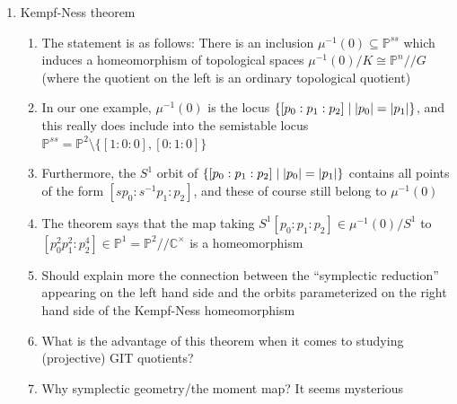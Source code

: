 \documentclass[11pt,leqno]{article}
\theoremstyle{plain}
\theoremstyle{definition}
\numberwithin{equation}{section}
\numberwithin{lem}{section}
\DeclareMathOperator{\diag}{diag}
\DeclareMathOperator{\U}{U}
\begin{document}
\begin{enumerate}
\begin{enumerate}
\begin{enumerate}
            \item For time, maybe I stick with one example; the case where $G = \mathbb C^\times$ acts on $\mathbb C^3$ by $t\cdot(x,y,z) = (tx,t^{-1}y,z)$ (so the action manifests $K = \mathbb S^1$ as a closed subgroup of $\U(n+1)$). We use the generator $A = i\diag(1,-1,0)$ of $T_eK$. Then the moment map we obtain is given explicitly by $\abr{\mu([p_0:p_1:p_2]), A} = \frac{\abr{i\diag(1,-1,0)(p_0,p_1,p_2), (p_0,p_1,p_2)}}{2i\norm{(p_0,p_1,p_2)}^2} = \frac{\abs{p_0}^2-\abs{p_1}^2}{2\norm{(p_0,p_1,p_2)}^2}$. 
        \end{enumerate}
    \end{enumerate}
    \item Kempf-Ness theorem
    \begin{enumerate}
        \item The statement is as follows: There is an inclusion $\mu^{-1}(0)\subseteq \mathbb P^{ss}$ which induces a homeomorphism of topological spaces $\mu^{-1}(0)/K\cong \mathbb P^n/\!/G$ (where the quotient on the left is an ordinary topological quotient)
        \item In our one example, $\mu^{-1}(0)$ is the locus $\{[p_0:p_1:p_2]\mid \abs{p_0} = \abs{p_1}\}$, and this really does include into the semistable locus $\mathbb P^{ss} = \mathbb P^2\setminus\{[1:0:0], [0:1:0]\}$
        \item Furthermore, the $S^1$ orbit of $\{[p_0:p_1:p_2]\mid \abs{p_0} = \abs{p_1}\}$ contains all points of the form $[sp_0:s^{-1}p_1:p_2]$, and these of course still belong to $\mu^{-1}(0)$
        \item The theorem says that the map taking $S^1[p_0:p_1:p_2]\in \mu^{-1}(0)/S^1$ to $[p_0^2p_1^2:p_2^4]\in\mathbb P^1 = \mathbb P^2/\!/\mathbb C^\times$ is a homeomorphism
        \item Should explain more the connection between the ``symplectic reduction'' appearing on the left hand side and the orbits parameterized on the right hand side of the Kempf-Ness homeomorphism
        \item What is the advantage of this theorem when it comes to studying (projective) GIT quotients?
        \item Why symplectic geometry/the moment map? It seems mysterious
    \end{enumerate}
\end{enumerate}
\end{document}
